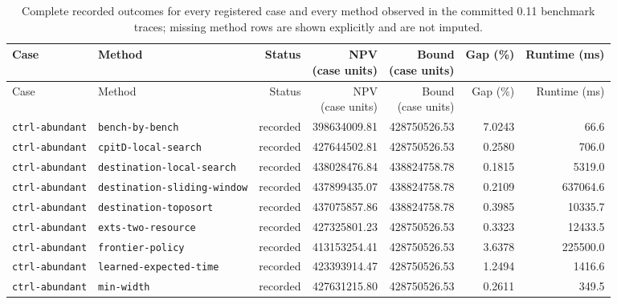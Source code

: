 \begingroup\scriptsize\setlength{\tabcolsep}{2.4pt}
\begin{longtable}{>{\raggedright\arraybackslash}p{}>{\raggedright\arraybackslash}p{}r r r r r}
\caption{Complete recorded outcomes for every registered case and every method observed in the committed 0.11 benchmark traces; missing method rows are shown explicitly and are not imputed.}\label{tab:case-method-outcomes}\\
\toprule Case & Method & Status & \shortstack{NPV\\(case units)} & \shortstack{Bound\\(case units)} & Gap (\%) & Runtime (ms) \\ \midrule\endfirsthead
\toprule Case & Method & Status & \shortstack{NPV\\(case units)} & \shortstack{Bound\\(case units)} & Gap (\%) & Runtime (ms) \\ \midrule\endhead
\texttt{ctrl\allowbreak-abundant} & \texttt{bench\allowbreak-by\allowbreak-bench} & recorded & 398634009.81 & 428750526.53 & 7.0243 & 66.6 \\
\texttt{ctrl\allowbreak-abundant} & \texttt{cpitD\allowbreak-local\allowbreak-search} & recorded & 427644502.81 & 428750526.53 & 0.2580 & 706.0 \\
\texttt{ctrl\allowbreak-abundant} & \texttt{destination\allowbreak-local\allowbreak-search} & recorded & 438028476.84 & 438824758.78 & 0.1815 & 5319.0 \\
\texttt{ctrl\allowbreak-abundant} & \texttt{destination\allowbreak-sliding\allowbreak-window} & recorded & 437899435.07 & 438824758.78 & 0.2109 & 637064.6 \\
\texttt{ctrl\allowbreak-abundant} & \texttt{destination\allowbreak-toposort} & recorded & 437075857.86 & 438824758.78 & 0.3985 & 10335.7 \\
\texttt{ctrl\allowbreak-abundant} & \texttt{exts\allowbreak-two\allowbreak-resource} & recorded & 427325801.23 & 428750526.53 & 0.3323 & 12433.5 \\
\texttt{ctrl\allowbreak-abundant} & \texttt{frontier\allowbreak-policy} & recorded & 413153254.41 & 428750526.53 & 3.6378 & 225500.0 \\
\texttt{ctrl\allowbreak-abundant} & \texttt{learned\allowbreak-expected\allowbreak-time} & recorded & 423393914.47 & 428750526.53 & 1.2494 & 1416.6 \\
\texttt{ctrl\allowbreak-abundant} & \texttt{min\allowbreak-width} & recorded & 427631215.80 & 428750526.53 & 0.2611 & 349.5 \\

\end{longtable}
